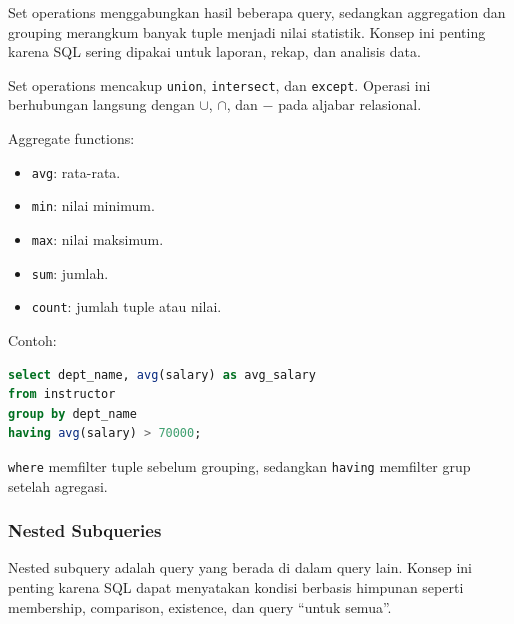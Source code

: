 \begin{jawab}
Set operations menggabungkan hasil beberapa query, sedangkan aggregation dan grouping merangkum banyak tuple menjadi nilai statistik. Konsep ini penting karena SQL sering dipakai untuk laporan, rekap, dan analisis data.
\end{jawab}

Set operations mencakup \texttt{union}, \texttt{intersect}, dan \texttt{except}. Operasi ini berhubungan langsung dengan \(\cup\), \(\cap\), dan \(-\) pada aljabar relasional.

Aggregate functions:
\begin{itemize}
    \item \texttt{avg}: rata-rata.
    \item \texttt{min}: nilai minimum.
    \item \texttt{max}: nilai maksimum.
    \item \texttt{sum}: jumlah.
    \item \texttt{count}: jumlah tuple atau nilai.
\end{itemize}

Contoh:
\begin{lstlisting}[language=SQL, caption={Aggregation dan grouping}, label={lst:sql-grouping}]
select dept_name, avg(salary) as avg_salary
from instructor
group by dept_name
having avg(salary) > 70000;
\end{lstlisting}

\texttt{where} memfilter tuple sebelum grouping, sedangkan \texttt{having} memfilter grup setelah agregasi.

\subsubsection{Nested Subqueries}

\begin{jawab}
Nested subquery adalah query yang berada di dalam query lain. Konsep ini penting karena SQL dapat menyatakan kondisi berbasis himpunan seperti membership, comparison, existence, dan query ``untuk semua''.
\end{jawab}

